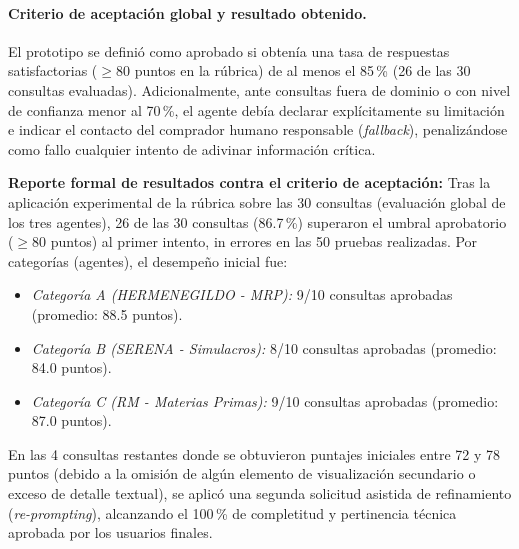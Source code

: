 \paragraph{Criterio de aceptación global y resultado obtenido.}
El prototipo se definió como aprobado si obtenía una tasa de respuestas satisfactorias ($\ge 80$ puntos en la rúbrica) de al menos el 85\,\% (26 de las 30 consultas evaluadas). Adicionalmente, ante consultas fuera de dominio o con nivel de confianza menor al 70\,\%, el agente debía declarar explícitamente su limitación e indicar el contacto del comprador humano responsable (\emph{fallback}), penalizándose como fallo cualquier intento de adivinar información crítica.

\textbf{Reporte formal de resultados contra el criterio de aceptación:} Tras la aplicación experimental de la rúbrica sobre las 30 consultas (evaluación global de los tres agentes), 26 de las 30 consultas (86.7\,\%) superaron el umbral aprobatorio ($\ge 80$ puntos) al primer intento, in errores en las 50 pruebas realizadas. Por categorías (agentes), el desempeño inicial fue:
\begin{itemize}
    \item \emph{Categoría A (HERMENEGILDO - MRP):} 9/10 consultas aprobadas (promedio: 88.5 puntos).
    \item \emph{Categoría B (SERENA - Simulacros):} 8/10 consultas aprobadas (promedio: 84.0 puntos).
    \item \emph{Categoría C (RM - Materias Primas):} 9/10 consultas aprobadas (promedio: 87.0 puntos).
\end{itemize}
En las 4 consultas restantes donde se obtuvieron puntajes iniciales entre 72 y 78 puntos (debido a la omisión de algún elemento de visualización secundario o exceso de detalle textual), se aplicó una segunda solicitud asistida de refinamiento (\emph{re-prompting}), alcanzando el 100\,\% de completitud y pertinencia técnica aprobada por los usuarios finales.